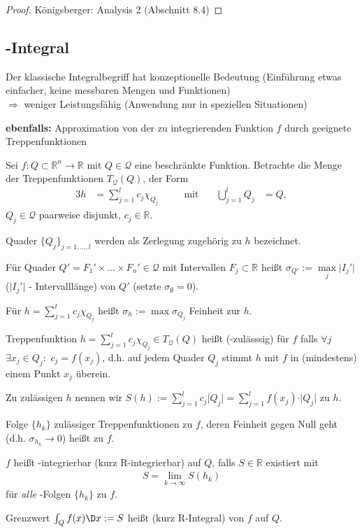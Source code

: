 \begin{proof}
	Königsberger: Analysis 2 (Abschnitt 8.4)
\end{proof}

\subsection{-Integral}
Der klassische Integralbegriff hat konzeptionelle Bedeutung (Einführung etwas einfacher, keine messbaren Mengen und Funktionen) \\
$\Rightarrow$ weniger Leistungsfähig (Anwendung nur in speziellen Situationen)

\textbf{ebenfalls:} Approximation von der zu integrierenden Funktion $f$ durch geeignete Treppenfunktionen
	
	Sei $f:Q\subset\mathbb{R}^n\to\mathbb{R}$ mit $Q\in\mathcal{Q}$ eine beschränkte Funktion. Betrachte die Menge der Treppenfunktionen $T_{\mathcal{Q}}(Q)$, der Form \begin{alignat*}{3}
		h &= \sum_{j=1}^l c_j \chi_{Q_j} & &\quad\text{mit}\quad & \bigcup_{j=1}^l Q_j&= Q,
	\end{alignat*}
	$Q_j\in\mathcal{Q}$ paarweise disjunkt, $c_j\in \mathbb{R}$.
	
	Quader $\{ Q_j\}_{j=1,\dotsc,l}$ werden als Zerlegung zugehörig zu $h$ bezeichnet.

\begin{*definition}
	Für Quader $Q' = F_1'\times \dotsc\times F_n'\in\mathcal{Q}$ mit Intervallen $F_j\subset\mathbb{R}$ heißt $\sigma_{Q'} := \max\limits_{j} \vert I_j'\vert$ ($\vert I_j'\vert$ - Intervalllänge)  von $Q'$ (setzte $\sigma_\emptyset = 0$).
	
	Für $h=\sum_{j=1}^l c_j \chi_{Q_j}$ heißt $\sigma_h := \max \sigma_{Q_j}$ Feinheit zur  $h$.
	
	Treppenfunktion $h=\sum_{j=1}^l c_j \chi_{Q_j}\in T_{\mathcal{Q}}(Q)$ heißt  (-zulässsig) für $f$ falls $\forall j$ $\exists x_j\in Q_j:$ $c_j = f(x_j)$, d.h. auf jedem Quader $Q_j$ stimmt $h$ mit $f$ in (mindestens) einem Punkt $x_j$ überein.
	
	Zu zulässigen $h$ nennen wir $S(h) := \sum_{j=1}^l c_j \vert Q_j\vert = \sum_{j=1}^l f(x_j) \cdot \vert Q_j\vert$  zu $h$.
	
	Folge $\{ h_k\}$ zulässiger Treppenfunktionen zu $f$, deren Feinheit gegen Null geht (d.h. $\sigma_{h_k}\to 0$) heißt  zu $f$.
	
	$f$ heißt -integrierbar (kurz R-integrierbar) auf $Q$, falls $S\in \mathbb{R}$ existiert mit \begin{align}
	S = \lim\limits_{k\to\infty} S(h_k)\end{align} für \emph{alle} -Folgen $\{ h_k \}$ zu $f$.
	
	Grenzwert $\int_Q f(x) \D x := S$ heißt  (kurz R-Integral) von $f$ auf $Q$.
\end{*definition}

